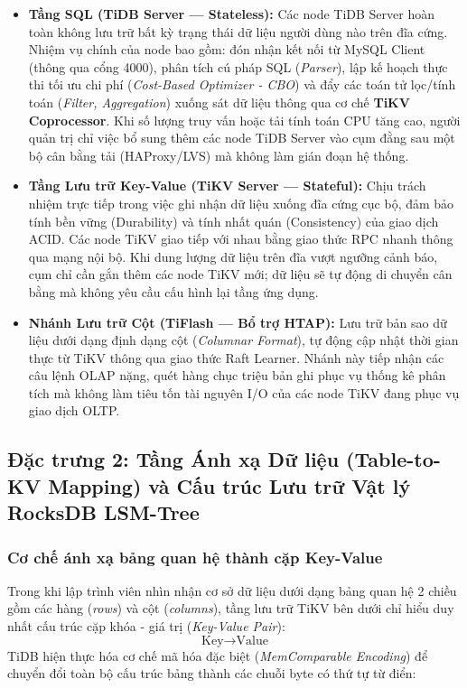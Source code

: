\begin{itemize}
  \item \textbf{Tầng SQL (TiDB Server --- Stateless):} Các node TiDB Server hoàn toàn không lưu trữ bất kỳ trạng thái dữ liệu người dùng nào trên đĩa cứng. Nhiệm vụ chính của node bao gồm: đón nhận kết nối từ MySQL Client (thông qua cổng 4000), phân tích cú pháp SQL (\textit{Parser}), lập kế hoạch thực thi tối ưu chi phí (\textit{Cost-Based Optimizer - CBO}) và đẩy các toán tử lọc/tính toán (\textit{Filter, Aggregation}) xuống sát dữ liệu thông qua cơ chế \textbf{TiKV Coprocessor}. Khi số lượng truy vấn hoặc tải tính toán CPU tăng cao, người quản trị chỉ việc bổ sung thêm các node TiDB Server vào cụm đằng sau một bộ cân bằng tải (HAProxy/LVS) mà không làm gián đoạn hệ thống.
  \item \textbf{Tầng Lưu trữ Key-Value (TiKV Server --- Stateful):} Chịu trách nhiệm trực tiếp trong việc ghi nhận dữ liệu xuống đĩa cứng cục bộ, đảm bảo tính bền vững (Durability) và tính nhất quán (Consistency) của giao dịch ACID. Các node TiKV giao tiếp với nhau bằng giao thức RPC nhanh thông qua mạng nội bộ. Khi dung lượng dữ liệu trên đĩa vượt ngưỡng cảnh báo, cụm chỉ cần gắn thêm các node TiKV mới; dữ liệu sẽ tự động di chuyển cân bằng mà không yêu cầu cấu hình lại tầng ứng dụng.
  \item \textbf{Nhánh Lưu trữ Cột (TiFlash --- Bổ trợ HTAP):} Lưu trữ bản sao dữ liệu dưới dạng định dạng cột (\textit{Columnar Format}), tự động cập nhật thời gian thực từ TiKV thông qua giao thức Raft Learner. Nhánh này tiếp nhận các câu lệnh OLAP nặng, quét hàng chục triệu bản ghi phục vụ thống kê phân tích mà không làm tiêu tốn tài nguyên I/O của các node TiKV đang phục vụ giao dịch OLTP.
\end{itemize}

\subsection{Đặc trưng 2: Tầng Ánh xạ Dữ liệu (Table-to-KV Mapping) và Cấu trúc Lưu trữ Vật lý RocksDB LSM-Tree}

\subsubsection{Cơ chế ánh xạ bảng quan hệ thành cặp Key-Value}
Trong khi lập trình viên nhìn nhận cơ sở dữ liệu dưới dạng bảng quan hệ 2 chiều gồm các hàng (\textit{rows}) và cột (\textit{columns}), tầng lưu trữ TiKV bên dưới chỉ hiểu duy nhất cấu trúc cặp khóa - giá trị (\textit{Key-Value Pair}):
\begin{equation}
  \text{Key} \rightarrow \text{Value}
\end{equation}
TiDB hiện thực hóa cơ chế mã hóa đặc biệt (\textit{MemComparable Encoding}) để chuyển đổi toàn bộ cấu trúc bảng thành các chuỗi byte có thứ tự từ điển:

